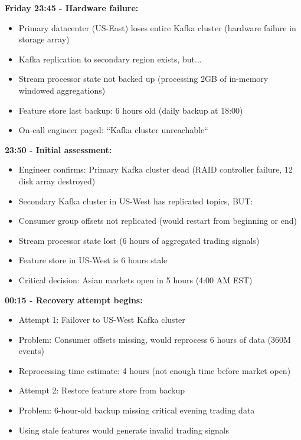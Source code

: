 \textbf{Friday 23:45 - Hardware failure:}
\begin{itemize}
    \item Primary datacenter (US-East) loses entire Kafka cluster (hardware failure in storage array)
    \item Kafka replication to secondary region exists, but...
    \item Stream processor state not backed up (processing 2GB of in-memory windowed aggregations)
    \item Feature store last backup: 6 hours old (daily backup at 18:00)
    \item On-call engineer paged: ``Kafka cluster unreachable``
\end{itemize}

\textbf{23:50 - Initial assessment:}
\begin{itemize}
    \item Engineer confirms: Primary Kafka cluster dead (RAID controller failure, 12 disk array destroyed)
    \item Secondary Kafka cluster in US-West has replicated topics, BUT:
    \item Consumer group offsets not replicated (would restart from beginning or end)
    \item Stream processor state lost (6 hours of aggregated trading signals)
    \item Feature store in US-West is 6 hours stale
    \item Critical decision: Asian markets open in 5 hours (4:00 AM EST)
\end{itemize}

\textbf{00:15 - Recovery attempt begins:}
\begin{itemize}
    \item Attempt 1: Failover to US-West Kafka cluster
    \item Problem: Consumer offsets missing, would reprocess 6 hours of data (360M events)
    \item Reprocessing time estimate: 4 hours (not enough time before market open)
    \item Attempt 2: Restore feature store from backup
    \item Problem: 6-hour-old backup missing critical evening trading data
    \item Using stale features would generate invalid trading signals
\end{itemize}

